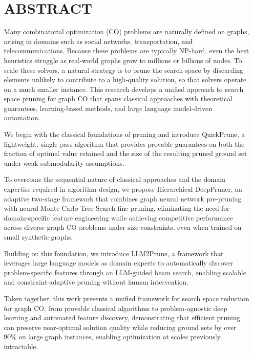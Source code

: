 %
%
%
%
%

\chapter*{ABSTRACT}

\pagestyle{plain} %
\setcounter{page}{2}


Many combinatorial optimization (CO) problems are naturally defined on graphs, arising
in domains such as social networks, transportation, and telecommunications. Because
these problems are typically NP-hard, even the best heuristics struggle as real-world
graphs grow to millions or billions of nodes. To scale these solvers, a natural strategy is to prune the search
space by discarding elements unlikely to contribute to a high-quality solution, so that
solvers operate on a much smaller instance. This research develops a unified approach to
search space pruning for graph CO that spans classical approaches with theoretical guarantees, learning-based
methods, and large language model-driven automation.

We begin with the classical foundations of pruning and introduce QuickPrune, a
lightweight, single-pass algorithm that provides provable guarantees on both the fraction
of optimal value retained and the size of the resulting pruned ground set under weak
submodularity assumptions.

To overcome the sequential nature of classical approaches and the domain expertise
required in algorithm design, we propose Hierarchical DeepPruner, an adaptive two-stage
framework that combines graph neural network pre-pruning with neural Monte Carlo Tree
Search fine-pruning, eliminating the need for domain-specific feature engineering while
achieving competitive performance across diverse graph CO problems under size
constraints, even when trained on small synthetic graphs.

Building on this foundation, we introduce LLM2Prune, a framework that leverages large
language models as domain experts to automatically discover problem-specific features through an LLM-guided beam search, enabling scalable and constraint-adaptive
pruning without human intervention.

Taken together, this work presents a unified framework for search space reduction for graph CO,
from provable classical algorithms to problem-agnostic deep learning and automated
feature discovery, demonstrating that efficient pruning can preserve near-optimal solution
quality while reducing ground sets by over 90\% on large graph instances, enabling
optimization at scales previously intractable.

\pagebreak{}
